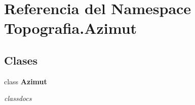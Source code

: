\section{Referencia del Namespace Topografia.\-Azimut}
\label{namespaceTopografia_1_1Azimut}
\subsection*{Clases}
\begin{DoxyCompactItemize}
\item 
class {\bf Azimut}
\begin{DoxyCompactList}\small\item\em classdocs \end{DoxyCompactList}\end{DoxyCompactItemize}
